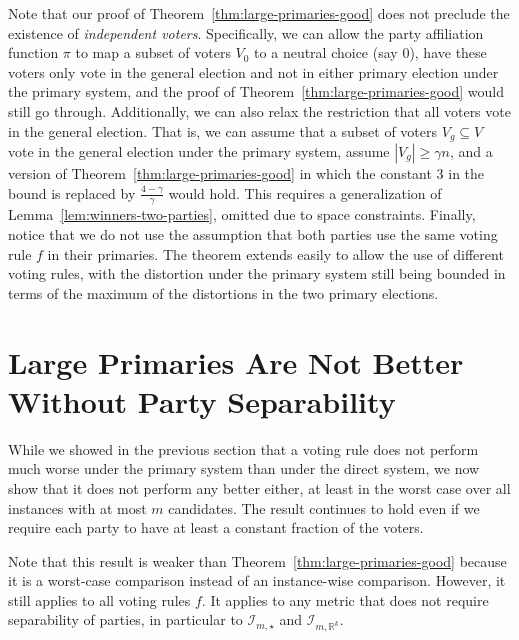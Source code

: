 \documentclass[letterpaper]{article} %
\theoremstyle{definition}
\newcommand{\bbR}{\mathbb{R}}
\newcommand{\calI}{\mathcal{I}}
\newcommand{\all}{\star}
\newcommand{\euc}[1]{\bbR^{#1}}
\newcommand{\I}{\calI}
\begin{document}
Note that our proof of Theorem~\ref{thm:large-primaries-good} does not preclude the existence of \emph{independent voters}. Specifically, we can allow the party affiliation function $\pi$ to map a subset of voters $V_0$ to a neutral choice (say $0$), have these voters only vote in the general election and not in either primary election under the primary system, and the proof of Theorem~\ref{thm:large-primaries-good} would still go through. Additionally, we can also relax the restriction that all voters vote in the general election. That is, we can assume that a subset of voters $V_g \subseteq V$ vote in the general election under the primary system, assume $|V_g| \ge \gamma n$, and a version of Theorem~\ref{thm:large-primaries-good} in which the constant $3$ in the bound is replaced by $\frac{4-\gamma}{\gamma}$ would hold. This requires a generalization of Lemma~\ref{lem:winners-two-parties}, omitted due to space constraints. Finally, notice that we do not use the assumption that both parties use the same voting rule $f$ in their primaries. The theorem extends easily to allow the use of different voting rules, with the distortion under the primary system still being bounded in terms of the maximum of the distortions in the two primary elections.

\section{Large Primaries Are Not Better\\Without Party Separability}
\label{sec:large-primaries-not-better-all}

While we showed in the previous section that a voting rule does not perform much worse under the primary system than under the direct system, we now show that it does not perform any better either, at least in the worst case over all instances with at most $m$ candidates. The result continues to hold even if we require each party to have at least a constant fraction of the voters.

Note that this result is weaker than Theorem~\ref{thm:large-primaries-good} because it is a worst-case comparison instead of an instance-wise comparison. However, it still applies to all voting rules $f$. It applies to any metric that does not require separability of parties, in particular to $\I_{m,\all}$ and $\I_{m,\euc{k}}$.
\end{document}
